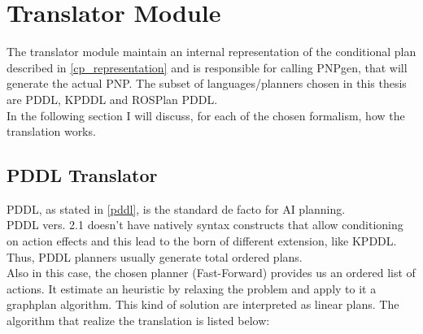 \documentclass[pdftex,12pt,a4paper]{report}
\begin{document}
\section{Translator Module}
The translator module maintain an internal representation of the conditional plan described in \ref{cp_representation} and is responsible for calling PNPgen, that will generate the actual PNP.
The subset of languages/planners chosen in this thesis are PDDL, KPDDL and ROSPlan PDDL.\\
In the following section I will discuss, for each of the chosen formalism, how the translation works.  

\subsection{PDDL Translator}
PDDL, as stated in \ref{pddl}, is the standard de facto for AI planning. \\
PDDL vers. 2.1 doesn't have natively syntax constructs that allow conditioning on action effects and this lead to the born of different extension, like KPDDL.
Thus, PDDL planners usually generate total ordered plans.\\ 
Also in this case, the chosen planner (Fast-Forward) provides us an ordered list of actions. It estimate an heuristic by relaxing the problem and apply to it a graphplan algorithm.
This kind of solution are interpreted as linear plans. 
The algorithm that realize the translation is listed below:
\newline 
{}\\
\end{document}
